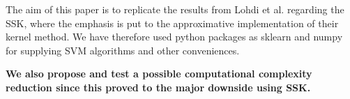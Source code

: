 The aim of this paper is to replicate the results from Lohdi et al. regarding the SSK, where the emphasis is put to the approximative implementation of their kernel method. We have therefore used python packages as sklearn and numpy for supplying SVM algorithms and other conveniences. 

\textbf{We also propose and test a possible computational complexity reduction since this proved to the major downside using SSK.}
